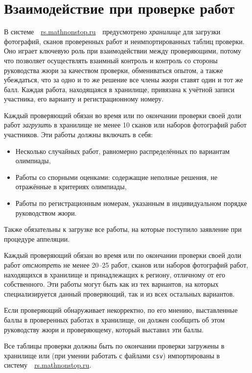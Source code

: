 \documentclass[a4paper,12pt]{article}
\begin{document}
\section{Взаимодействие при проверке работ}

В системе\ \ \url{rs.mathnonstop.ru}\ \ предусмотрено {\it хранилище} для загрузки фотографий, сканов проверенных работ и неимпортированных таблиц проверки. Оно играет ключевую роль при взаимодействии между проверяющими, потому что позволяет осуществлять взаимный контроль и контроль со стороны руководства жюри за качеством проверки, обмениваться опытом, а также убеждаться, что за одно и то же решение все члены жюри ставят один и тот же балл. Каждая работа, находящаяся в хранилище, привязана к учётной записи участника, его варианту и регистрационному номеру.

Каждый проверяющий обязан во время или по окончании проверки своей доли работ {\it загрузить} в хранилище не менее 10 сканов или наборов фотографий работ участников. Эти работы должны включать в себя: \vspace{-4mm}

\begin{itemize}
	\item Несколько случайных работ, равномерно распределённых по вариантам олимпиады,
	\item Работы со спорными оценками: содержащие неполные решения, не отражённые в критериях олимпиады,
	\item Работы по регистрационным номерам, указанным в индивидуальном порядке руководством жюри.
\end{itemize}

Также обязательны к загрузке все работы, на которые поступило заявление при процедуре аппеляции.

Каждый проверяющий обязан во время или по окончании проверки своей доли работ {\it отсмотреть} не менее 20–25 работ, сканов или наборов фотографий работ, находящихся в хранилище и принадлежащих к региону, отличному от его собственного. Эти работы могут быть как из тех вариантов, на которых специализируется данный проверяющий, так и из всех остальных вариантов.

Если проверяющий обнаруживает некорректно, по его мнению, выставленные баллы в проверенных работах в хранилище, он должен сообщить об этом руководству жюри и проверяющему, который выставил эти баллы.

Все таблицы проверки должны быть по окончании проверки загружены в хранилище или (при умении работать с файлами {\tt csv}) импортированы в систему\ \ \url{rs.mathnonstop.ru}.
\end{document}
